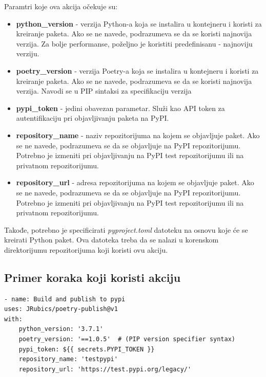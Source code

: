\documentclass[12pt]{report}
\begin{document}
Paramtri koje ova akcija očekuje su:

\begin{itemize}
    \item \textbf{python\_version} - verzija Python-a koja se instalira u kontejneru i koristi za kreiranje paketa. Ako se ne navede, podrazumeva se da se koristi najnovija verzija. Za bolje performanse, poželjno je koristiti predefinisanu - najnoviju verziju.
    \item \textbf{poetry\_version} - verzija Poetry-a koja se instalira u kontejneru i koristi za kreiranje paketa. Ako se ne navede, podrazumeva se da se koristi najnovija verzija. Navodi se u PIP sintaksi za specifikaciju verzija
    \item \textbf{pypi\_token} - jedini obavezan parametar. Služi kao API token za autentifikaciju pri objavljivanju paketa na PyPI.
    \item \textbf{repository\_name} - naziv repozitorijuma na kojem se objavljuje paket. Ako se ne navede, podrazumeva se da se objavljuje na PyPI repozitorijumu. Potrebno je izmeniti pri objavljivanju na PyPI test repozitorijumu ili na privatnom repozitorijumu.
    \item \textbf{repository\_url} - adresa repozitorijuma na kojem se objavljuje paket. Ako se ne navede, podrazumeva se da se objavljuje na PyPI repozitorijumu. Potrebno je izmeniti pri objavljivanju na PyPI test repozitorijumu ili na privatnom repozitorijumu.
\end{itemize}

Takođe, potrebno je specificirati \textit{pyproject.toml} datoteku na osnovu koje će se kreirati Python paket. Ova datoteka treba da se nalazi u korenskom direktorijumu repozitorijuma koji koristi ovu akciju.

\subsection{Primer koraka koji koristi akciju}

\begin{verbatim}
- name: Build and publish to pypi
uses: JRubics/poetry-publish@v1
with:
    python_version: '3.7.1'
    poetry_version: '==1.0.5'  # (PIP version specifier syntax)
    pypi_token: ${{ secrets.PYPI_TOKEN }}
    repository_name: 'testpypi'
    repository_url: 'https://test.pypi.org/legacy/'
\end{verbatim}
\end{document}
